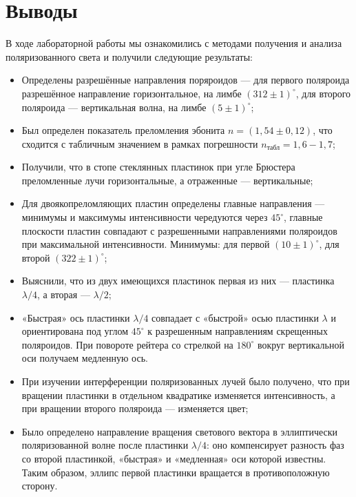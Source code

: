 \documentclass[a4paper,12pt]{extarticle}
\begin{document}
\section*{Выводы}
В ходе лабораторной работы мы ознакомились с методами получения и анализа поляризованного света и получили следующие результаты:
\begin{itemize}
\item Определены разрешённые направления поряроидов --- для первого поляроида разрешённое направление горизонтальное, на лимбе $(312 \pm 1)^{\circ}$, для второго поляроида --- вертикальная волна, на лимбе $(5 \pm 1)^{\circ}$;
\item Был определен показатель преломления эбонита $n = (1,54 \pm 0,12)$, что сходится с табличным значением в рамках погрешности $n_{\text{табл}} = 1,6-1,7$;
\item Получили, что в стопе стеклянных пластинок при угле Брюстера преломленные лучи горизонтальные, а отраженные --- вертикальные;
\item Для двоякопреломляющих пластин определены главные направления --- минимумы и
максимумы интенсивности чередуются через $45^{\circ}$, главные плоскости пластин совпадают с разрешенными направлениями поляроидов при максимальной интенсивности. Минимумы: для первой $(10 \pm 1)^{\circ}$, для второй $(322 \pm 1)^{\circ}$;
\item Выяснили, что из двух имеющихся пластинок первая из них --- пластинка $\lambda/4$, а вторая --- $\lambda/2$;
\item «Быстрая» ось пластинки $\lambda/4$ совпадает с «быстрой» осью пластинки $\lambda$ и ориентирована под углом $45^{\circ}$ к разрешенным направлениям скрещенных поляроидов. При повороте рейтера со стрелкой на $180^{\circ}$ вокруг вертикальной оси получаем медленную ось.
\item При изучении интерференции поляризованных лучей было получено, что при вращении пластинки в отдельном квадратике изменяется интенсивность, а при вращении второго поляроида --- изменяется цвет;
\item Было определено направление вращения светового вектора в эллиптически поляризованной волне после пластинки $\lambda/4$: оно компенсирует разность фаз со второй пластинкой, «быстрая» и «медленная» оси которой известны. Таким образом, эллипс первой пластинки вращается в противоположную сторону.
\end{itemize}
\end{document}
